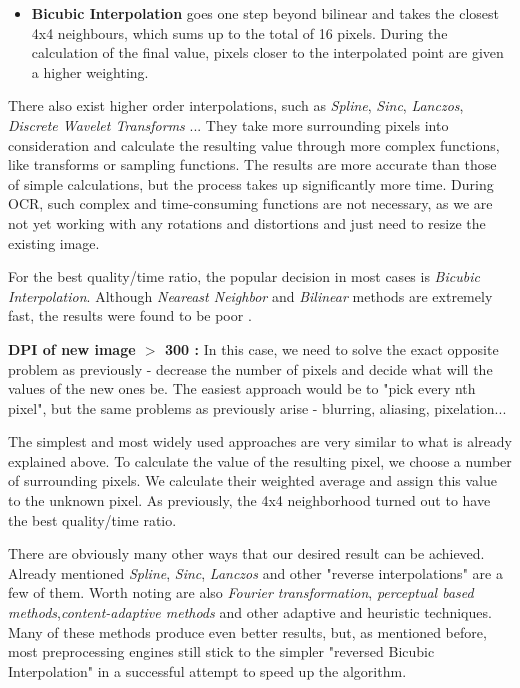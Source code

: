 \begin{description}
\begin{itemize}
\item\textbf {Bicubic Interpolation } goes one step beyond bilinear and takes the closest 4x4 neighbours, which sums up to the total of 16 pixels. During the calculation of the final value, pixels closer to the interpolated point are given a higher weighting.

\end{itemize}

There also exist higher order interpolations, such as \emph{Spline}, \emph{Sinc}, \emph{Lanczos}, \emph{Discrete Wavelet Transforms}  \citep{interpolation}... They take more surrounding pixels into consideration and calculate the resulting value through more complex functions, like transforms or sampling functions. The results are more accurate than those of simple calculations, but the process takes up significantly more time. During OCR, such complex and time-consuming functions are not necessary, as we are not yet working with any rotations and distortions and just need to resize the existing image.

For the best quality/time ratio, the popular decision in most cases is \emph{Bicubic Interpolation}. Although \emph{Neareast Neighbor} and \emph{Bilinear} methods are extremely fast, the results were found to be poor \citep{interpolationComp}.

\item\textbf {DPI of new image $>$ 300 : } In this case, we need to solve the exact opposite problem as previously - decrease the number of pixels and decide what will the values of the new ones be. The easiest approach would be to "pick every nth pixel", but the same problems as previously arise - blurring, aliasing, pixelation...

The simplest and most widely used approaches are very similar to what is already explained above. To calculate the value of the resulting pixel, we choose a number of surrounding pixels. We calculate their weighted average and assign this value to the unknown pixel. As previously, the 4x4 neighborhood turned out to have the best quality/time ratio.

There are obviously many other ways that our desired result can be achieved. Already mentioned \emph{Spline}, \emph{Sinc}, \emph{Lanczos} and other "reverse interpolations" are a few of them. Worth noting are also \emph{Fourier transformation}, \emph{perceptual based methods},\emph{content-adaptive methods} and other adaptive and heuristic techniques.
Many of these methods produce even better results, but, as mentioned before, most preprocessing engines still stick to the simpler "reversed Bicubic Interpolation" in a successful attempt to speed up the algorithm.

\end{description}

